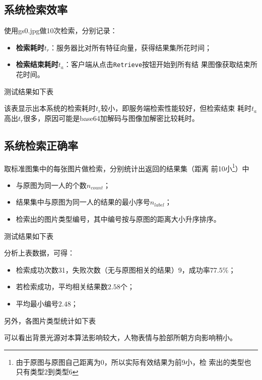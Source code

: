 \subsection{系统检索效率}
\label{sec:sys-retrieval-effi}

使用gs0.jpg做10次检索，分别记录：
\begin{itemize}
  \item \textbf{检索耗时$t_r$}：服务器比对所有特征向量，获得结果集所花时间；
  \item \textbf{检索结束耗时$t_a$}：客户端从点击\texttt{Retrieve}按钮开始到所有结
    果图像获取结束所花时间。
\end{itemize}

测试结果如下表



该表显示出本系统的检索耗时$t_r$较小，即服务端检索性能较好，但检索结束
耗时$t_a$高出$t_r$很多，原因可能是base64加解码与图像加解密比较耗时。

\subsection{系统检索正确率}
\label{sec:sys-retrieval-correct-rate}

取标准图集中的每张图片做检索，分别统计出返回的结果集（距离
前10小\footnote{由于原图与原图自己距离为0，所以实际有效结果为前9小，检
  索出的类型也只有类型2到类型6}）中

\begin{itemize}
  \item 与原图为同一人的个数$n_{count}$；
  \item 结果集中与原图为同一人的结果的最小序号$n_{label}$；
  \item 检索出的图片类型编号，其中编号按与原图的距离大小升序排序。
\end{itemize}


测试结果如下表



分析上表数据，可得：
\begin{itemize}
  \item 检索成功次数31，失败次数（无与原图相关的结果）9，成功率$77.5\%$；
  \item 若检索成功，平均相关结果数$2.58$个；
  \item 平均最小编号$2.48$；
\end{itemize}

另外，各图片类型统计如下表



可以看出背景光源对本算法影响较大，人物表情与脸部所朝方向影响稍小。

